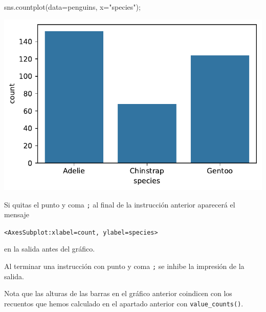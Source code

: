 \documentclass[
  a4paper,
  noprof,
  12pt,
  notoc,
  nosols,
  nobib]{mnye}
\newenvironment{Shaded}{\begin{snugshade}}{\end{snugshade}}
\newcommand{\NormalTok}[1]{\textcolor[rgb]{0.00,0.23,0.31}{#1}}
\newcommand{\OperatorTok}[1]{\textcolor[rgb]{0.37,0.37,0.37}{#1}}
\newcommand{\StringTok}[1]{\textcolor[rgb]{0.13,0.47,0.30}{#1}}
\theoremstyle{definition}
\theoremstyle{remark}
\begin{document}
\begin{Shaded}
\begin{Highlighting}[]
\NormalTok{sns.countplot(data}\OperatorTok{=}\NormalTok{penguins, x}\OperatorTok{=}\StringTok{"species"}\NormalTok{)}\OperatorTok{;}
\end{Highlighting}
\end{Shaded}

\includegraphics{chapters/1categorical_files/figure-pdf/cell-6-output-1.pdf}

\begin{tcolorbox}[enhanced jigsaw, opacityback=0, leftrule=.75mm, left=2mm, arc=.35mm, rightrule=.15mm, colframe=quarto-callout-note-color-frame, bottomrule=.15mm, colback=white, breakable, toprule=.15mm]
\begin{minipage}[t]{5.5mm}
\textcolor{quarto-callout-note-color}{\faInfo}
\end{minipage}%
\begin{minipage}[t]{\textwidth - 5.5mm}

Si quitas el punto y coma \texttt{;} al final de la instrucción anterior
aparecerá el mensaje

\texttt{\textless{}AxesSubplot:xlabel=\textquotesingle{}count\textquotesingle{},\ ylabel=\textquotesingle{}species\textquotesingle{}\textgreater{}}

en la salida antes del gráfico.

Al terminar una instrucción con punto y coma \texttt{;} se inhibe la
impresión de la salida.

\end{minipage}%
\end{tcolorbox}

Nota que las alturas de las barras en el gráfico anterior coindicen con
los recuentos que hemos calculado en el apartado anterior con
\texttt{value\_counts()}.
\end{document}
